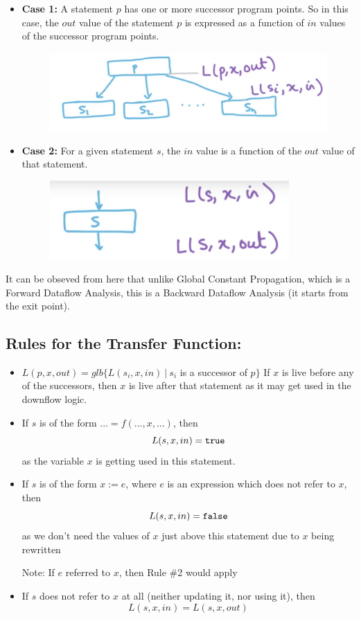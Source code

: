 \begin{itemize}
    \item \textbf{Case 1:} A statement $p$ has one or more successor program points. So in this case, the $out$ value of the statement $p$ is expressed as a function of $in$ values of the successor program points.
    \begin{figure}[H]
        \centering
        \includegraphics[height=3cm]{images/Module82_1.png}
    \end{figure}

    \item \textbf{Case 2:} For a given statement $s$, the $in$ value is a function of the $out$ value of that statement.
    \begin{figure}[H]
        \centering
        \includegraphics[height=3cm]{images/Module82_2.png}
    \end{figure}

\end{itemize}
It can be obseved from here that unlike Global Constant Propagation, which is a Forward Dataflow Analysis, this is a Backward Dataflow Analysis (it starts from the exit point).

\subsection{Rules for the Transfer Function:}
\begin{itemize}
    \item $L(p, x, out) = glb\{L(s_i, x, in)~|~s_i$ is a successor of $p\}$
    If $x$ is live before any of the successors, then $x$ is live after that statement as it may get used in the downflow logic.
    \item If $s$ is of the form $... = f(...,x,...)$, then $$L(s, x, in) = {\tt true}$$ as the variable $x$ is getting used in this statement.
    \item If $s$ is of the form $x := e$, where $e$ is an expression which does not refer to $x$, then $$L(s, x, in) = {\tt false}$$ as we don't need the values of $x$ just above this statement due to $x$ being rewritten
    
    Note: If $e$ referred to $x$, then Rule \#2 would apply
    \item If $s$ does not refer to $x$ at all (neither updating it, nor using it), then $$L(s, x, in) = L(s, x, out)$$
\end{itemize}

